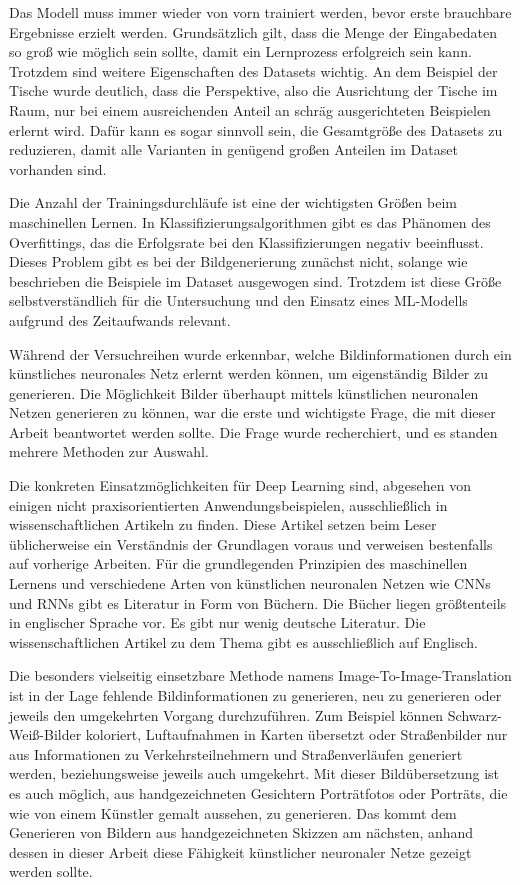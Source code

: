 Das Modell muss immer wieder von vorn trainiert werden, bevor erste brauchbare Ergebnisse erzielt werden. Grundsätzlich gilt, dass die Menge der Eingabedaten so groß wie möglich sein sollte, damit ein Lernprozess erfolgreich sein kann. Trotzdem sind weitere Eigenschaften des Datasets wichtig. An dem Beispiel der Tische wurde deutlich, dass die Perspektive, also die Ausrichtung der Tische im Raum, nur bei einem ausreichenden Anteil an schräg ausgerichteten Beispielen erlernt wird. Dafür kann es sogar sinnvoll sein, die Gesamtgröße des Datasets zu reduzieren, damit alle Varianten in genügend großen Anteilen im Dataset vorhanden sind.

Die Anzahl der Trainingsdurchläufe ist eine der wichtigsten Größen beim maschinellen Lernen. In Klassifizierungsalgorithmen gibt es das Phänomen des Overfittings, das die Erfolgsrate bei den Klassifizierungen negativ beeinflusst. Dieses Problem gibt es bei der Bildgenerierung zunächst nicht, solange wie beschrieben die Beispiele im Dataset ausgewogen sind. Trotzdem ist diese Größe selbstverständlich für die Untersuchung und den Einsatz eines ML-Modells aufgrund des Zeitaufwands relevant.

Während der Versuchreihen wurde erkennbar, welche Bildinformationen durch ein künstliches neuronales Netz erlernt werden können, um eigenständig Bilder zu generieren. Die Möglichkeit Bilder überhaupt mittels künstlichen neuronalen Netzen generieren zu können, war die erste und wichtigste Frage, die mit dieser Arbeit beantwortet werden sollte. Die Frage wurde recherchiert, und es standen mehrere Methoden zur Auswahl.

Die konkreten Einsatzmöglichkeiten für Deep Learning sind, abgesehen von einigen nicht praxisorientierten Anwendungsbeispielen, ausschließlich in wissenschaftlichen Artikeln zu finden. Diese Artikel setzen beim Leser üblicherweise ein Verständnis der Grundlagen voraus und verweisen bestenfalls auf vorherige Arbeiten. Für die grundlegenden Prinzipien des maschinellen Lernens und verschiedene Arten von künstlichen neuronalen Netzen wie CNNs und RNNs gibt es Literatur in Form von Büchern. Die Bücher liegen größtenteils in englischer Sprache vor. Es gibt nur wenig deutsche Literatur. Die wissenschaftlichen Artikel zu dem Thema gibt es ausschließlich auf Englisch.

Die besonders vielseitig einsetzbare Methode namens Image-To-Image-Translation ist in der Lage fehlende Bildinformationen zu generieren, neu zu generieren oder jeweils den umgekehrten Vorgang durchzuführen. Zum Beispiel können Schwarz-Weiß-Bilder koloriert, Luftaufnahmen in Karten übersetzt oder Straßenbilder nur aus Informationen zu Verkehrsteilnehmern und Straßenverläufen generiert werden, beziehungsweise jeweils auch umgekehrt. Mit dieser Bildübersetzung ist es auch möglich, aus handgezeichneten Gesichtern Porträtfotos oder Porträts, die wie von einem Künstler gemalt aussehen, zu generieren. Das kommt dem Generieren von Bildern aus handgezeichneten Skizzen am nächsten, anhand dessen in dieser Arbeit diese Fähigkeit künstlicher neuronaler Netze gezeigt werden sollte.

